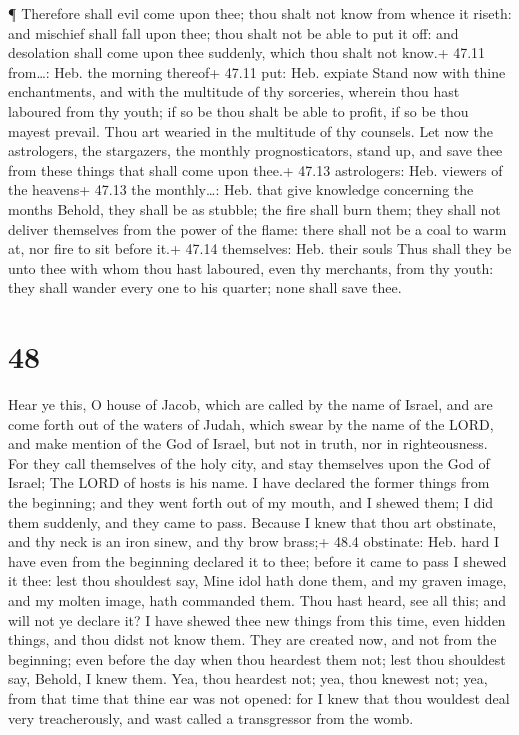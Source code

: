  ¶ Therefore shall evil come upon thee; thou shalt not know
from whence it riseth: and mischief shall fall upon thee; thou shalt not
be able to put it off: and desolation shall come upon thee suddenly,
which thou shalt not know.+ 47.11 from\ldots: Heb. the morning thereof+
47.11 put: Heb. expiate  Stand now with thine enchantments,
and with the multitude of thy sorceries, wherein thou hast laboured from
thy youth; if so be thou shalt be able to profit, if so be thou mayest
prevail.  Thou art wearied in the multitude of thy
counsels. Let now the astrologers, the stargazers, the monthly
prognosticators, stand up, and save thee from these things that shall
come upon thee.+ 47.13 astrologers: Heb. viewers of the heavens+ 47.13
the monthly\ldots: Heb. that give knowledge concerning the months
 Behold, they shall be as stubble; the fire shall burn
them; they shall not deliver themselves from the power of the flame:
there shall not be a coal to warm at, nor fire to sit before it.+ 47.14
themselves: Heb. their souls  Thus shall they be unto thee
with whom thou hast laboured, even thy merchants, from thy youth: they
shall wander every one to his quarter; none shall save thee.

\hypertarget{section-47}{%
\section{48}\label{section-47}}

 Hear ye this, O house of Jacob, which are called by the
name of Israel, and are come forth out of the waters of Judah, which
swear by the name of the LORD, and make mention of the God of Israel,
but not in truth, nor in righteousness.  For they call
themselves of the holy city, and stay themselves upon the God of Israel;
The LORD of hosts is his name.  I have declared the former
things from the beginning; and they went forth out of my mouth, and I
shewed them; I did them suddenly, and they came to pass. 
Because I knew that thou art obstinate, and thy neck is an iron sinew,
and thy brow brass;+ 48.4 obstinate: Heb. hard  I have even
from the beginning declared it to thee; before it came to pass I shewed
it thee: lest thou shouldest say, Mine idol hath done them, and my
graven image, and my molten image, hath commanded them. 
Thou hast heard, see all this; and will not ye declare it? I have shewed
thee new things from this time, even hidden things, and thou didst not
know them.  They are created now, and not from the
beginning; even before the day when thou heardest them not; lest thou
shouldest say, Behold, I knew them.  Yea, thou heardest not;
yea, thou knewest not; yea, from that time that thine ear was not
opened: for I knew that thou wouldest deal very treacherously, and wast
called a transgressor from the womb.

